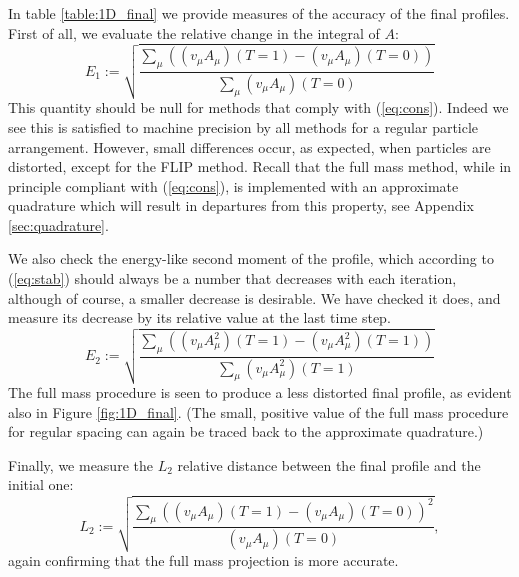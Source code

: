\documentclass{ws-ijcm}
\begin{document}
In table \ref{table:1D_final} we provide measures of the accuracy of
the final profiles. First of all, we evaluate the relative change in
the integral of $A$:
\[
E_1:= \sqrt{
  \frac{
    \sum_\mu \left(
      (v_\mu A_\mu)(T=1) -
      (v_\mu A_\mu)(T=0) 
    \right)
  }{
    \sum_\mu (v_\mu A_\mu)(T=0) 
  } 
}
\]
This quantity should be null for methods that comply with
(\ref{eq:cons}).  Indeed we see this is satisfied to machine precision
by all methods for a regular particle arrangement. However, small
differences occur, as expected, when particles are distorted, except
for the FLIP method. Recall that the full mass method, while in
principle compliant with (\ref{eq:cons}), is implemented with an
approximate quadrature which will result in departures from this
property, see Appendix \ref{sec:quadrature}.

We also check the energy-like second moment of the profile, which
according to (\ref{eq:stab}) should always be a number that decreases
with each iteration, although of course, a smaller decrease is
desirable. We have checked it does, and measure its decrease by its
relative value at the last time step.
\[
E_2:=
\sqrt{ 
  \frac{
    \sum_\mu \left(
      (v_\mu A_\mu^2)(T=1) -  
      (v_\mu A_\mu^2)(T=1)
    \right)
 }{
    \sum_\mu (v_\mu A_\mu^2)(T=1) } 
}
\]
The full mass procedure is seen to produce a less distorted final
profile, as evident also in Figure \ref{fig:1D_final}. (The small,
positive value of the full mass procedure for regular spacing
can again be traced back to the approximate quadrature.)

Finally, we measure the $L_2$ relative distance between the final
profile and the initial one:
\[
L_2 :=
\sqrt{\frac{ 
    \sum_\mu \left(
      (v_\mu A_\mu)(T=1) - (v_\mu A_\mu)(T=0) 
    \right)^2 }{
    (v_\mu A_\mu)(T=0)
  }
},
\]
again confirming that the full mass projection is more accurate.
\end{document}
